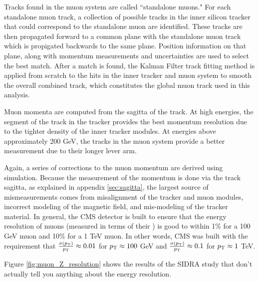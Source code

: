     Tracks found in the muon system are called ``standalone muons." For each standalone muon track, a collection of possible tracks in the inner silicon tracker that could correspond to the standalone muon are identified. These tracks are then propagated forward to a common plane with the standalone muon track which is propigated backwards to the same plane. Position information on that plane, along with momentum measurements and uncertainties are used to select the best match. \cite[sec 3]{cms_muons} \cite[sec 5.1]{muon_reco_AN} After a match is found, the Kalman Filter track fitting method is applied from scratch to the hits in the inner tracker and muon system to smooth the overall combined track, which constitutes the global muon track used in this analysis.

    Muon momenta are computed from the sagitta of the track. At high energies, the segment of the track in the tracker provides the best momentum resolution due to the tighter density of the inner tracker modules. At energies above approximately 200 GeV, the tracks in the muon system provide a better measurement due to their longer lever arm.  

    Again, a series of corrections to the muon momentum are derived using simulation. Because the measurement of the momentum is done via the track sagitta, as explained in appendix \ref{sec:sagitta}, the largest source of mismeasurements comes from misalignment of the tracker and muon modules, incorrect modeling of the magnetic field, and mis-modeling of the tracker material.\cite[sec. 6]{cms_muons} In general, the CMS detector is built to ensure that the energy resolution of muons (measured in terms of their \pt) is good to within 1\% for a 100 GeV muon and 10\% for a 1 TeV muon. In other words, CMS was built with the requirement that $\frac{\sigma(p_{\mathrm{T}})}{p_{\mathrm{T}}} \approx 0.01$ for $p_{\mathrm{T}} \approx 100$ GeV and $\frac{\sigma(p_{\mathrm{T}})}{p_{\mathrm{T}}} \approx 0.1$ for $p_{\mathrm{T}} \approx 1$ TeV. 

    Figure \ref{fig:muon_Z_resolution} shows the results of the SIDRA study that don't actually tell you anything about the energy resolution.


